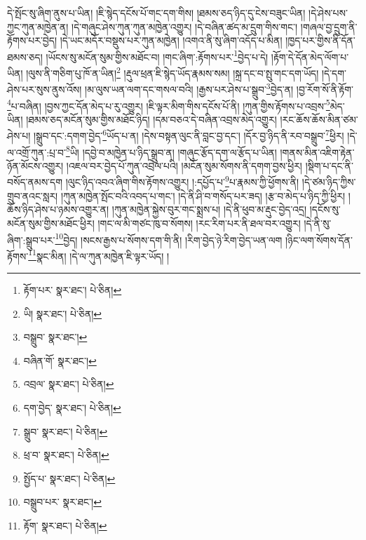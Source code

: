 དེ་སྤོང་སུ་ཞིག་ནུས་པ་ཡིན། །ཇི་སྙེད་དངོས་པོ་གང་དག་གིས། །ཐམས་ཅད་ཉིད་དུ་ངེས་བཟུང་ཡིན། །དེ་ཤེས་པས་ཀྱང་ཀུན་མཁྱེན་ན། །དེ་གཞུང་ཤེས་ཀུན་ཀུན་མཁྱེན་འགྱུར། །དེ་བཞིན་ཚད་མ་དྲུག་གིས་གང་། །གཞལ་བྱ་དྲུག་ནི་རྟོགས་པར་བྱེད། །དེ་ཡང་མདོར་བསྡུས་པར་ཀུན་མཁྱེན། །འགའ་ནི་སུ་ཞིག་འདོད་པ་མིན། །ཁྱད་པར་གྱིས་ནི་དོན་ཐམས་ཅད། །ཡོངས་སུ་མངོན་སུམ་གྱིས་མཐོང་བ། །གང་ཞིག་:རྟོགས་པར་\footnote{རྟོག་པར་  སྣར་ཐང་།  པེ་ཅིན། }བྱེད་པ་དེ། །རྟོག་དེ་དོན་མེད་ལོག་པ་ཡིན། །ལུས་ནི་གཅིག་པུ་ཁོ་ན་ཡིན།\footnote{ཡི།  སྣར་ཐང་།  པེ་ཅིན། } །རྡུལ་ཕྲན་ཇི་སྙེད་ཡོད་རྣམས་སམ། །སྐྲ་དང་བ་སྤུ་གང་དག་ཡོད། །དེ་དག་ཤེས་པར་སུས་ནུས་འོས། །མ་ལུས་ཡན་ལག་དང་གསལ་བའི། །རྒྱས་པར་ཤེས་པ་སྒྲུབ་\footnote{བསྒྲུབ་  སྣར་ཐང་། }བྱེད་ན། །བྱ་རོག་སོ་ནི་རྟོག་\footnote{བཞིན་ོག་  སྣར་ཐང་། }པ་བཞིན། །བྱས་ཀྱང་དོན་མེད་པ་རུ་འགྱུར། །ཇི་ལྟར་མིག་གིས་དངོས་པོ་ནི། །ཀུན་གྱིས་རྟོགས་པ་འབྲས་\footnote{འབྲལ་  སྣར་ཐང་།  པེ་ཅིན། }མེད་ཡིན། །ཐམས་ཅད་མངོན་སུམ་གྱིས་མཐོང་ཉིད། །དམ་བཅའ་དེ་བཞིན་འབྲས་མེད་འགྱུར། །རང་ཆོས་ཆོས་མིན་ཙམ་ཤེས་པ། །སྒྲུབ་དང་:དགག་བྱེད་\footnote{དག་བྱེད་  སྣར་ཐང་།  པེ་ཅིན། }ཡོད་པ་ན། །དེས་བསྟན་ལུང་ནི་བླང་བྱ་དང་། །དོར་བྱ་ཉིད་ནི་རབ་བསྒྲུབ་\footnote{སྒྲུབ་  སྣར་ཐང་།  པེ་ཅིན། }ཕྱིར། །དེ་ལ་འགྲོ་ཀུན་:པྲ་བ་\footnote{ཕྲ་བ་  སྣར་ཐང་།  པེ་ཅིན། }ཡི། །དབྱེ་བ་མཁྱེན་པ་ཉིད་སྒྲུབ་ན། །གཞུང་རྩོད་དག་ལ་རྩོད་པ་ཡིན། །གནས་མིན་འཇིག་རྟེན་ཉོན་མོངས་འགྱུར། །འཇལ་བར་བྱེད་པོ་ཀུན་འབྲེལ་པའི། །མངོན་སུམ་སོགས་ནི་དགག་བྱས་ཕྱིར། །སྡིག་པ་དང་ནི་བསོད་ནམས་དག །ལུང་ཉིད་འབའ་ཞིག་གིས་རྟོགས་འགྱུར། །:དཔྱོད་པ་\footnote{སྤྱོད་པ་  སྣར་ཐང་།  པེ་ཅིན། }པ་རྣམས་ཀྱི་ཕྱོགས་ནི། །དེ་ཙམ་ཉིད་ཀྱིས་གྲུབ་ནའང་སླར། །ཀུན་མཁྱེན་སྤོང་བའི་འབད་པ་གང་། །དེ་ནི་ཤི་བ་གསོད་པར་ཟད། །རྩ་བ་མེད་པ་ཉིད་ཀྱི་ཕྱིར། །ཆོས་ཉིད་ཤེས་པ་ཉམས་འགྱུར་ན། །ཀུན་མཁྱེན་སྐྱེས་བུར་གང་སྨྲས་པ། །དེ་ནི་ཕུབ་མ་རྡུང་བྱེད་འདྲ། །དངོས་སུ་མངོན་སུམ་གྱིས་མཐོང་ཕྱིར། །གང་ལ་མི་གཙང་ཁུ་བ་སོགས། །རང་རིག་པར་ནི་ཐལ་བར་འགྱུར། །དེ་ནི་སུ་ཞིག་:སྒྲུབ་པར་\footnote{བསྒྲུབ་པར་  སྣར་ཐང་། }བྱེད། །སངས་རྒྱས་པ་སོགས་དག་གི་ནི། །རིག་བྱེད་ཉེ་རིག་བྱེད་ཡན་ལག །ཉིང་ལག་སོགས་དོན་རྟོགས་\footnote{རྟོག་  སྣར་ཐང་།  པེ་ཅིན། }སྣང་མིན། །དེ་ལ་ཀུན་མཁྱེན་ཇི་ལྟར་ཡོད། །
